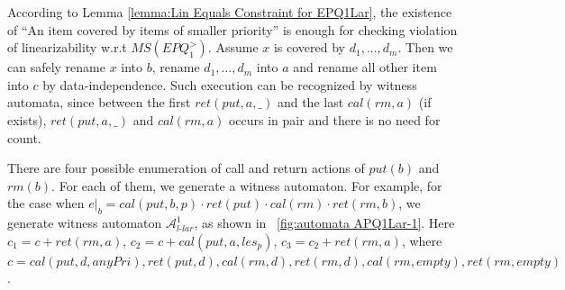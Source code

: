 According to Lemma \ref{lemma:Lin Equals Constraint for EPQ1Lar}, the existence of ``An item covered by items of smaller priority'' is enough for checking violation of linearizability w.r.t $\textit{MS}(\textit{EPQ}_1^{>})$. Assume $x$ is covered by $d_1,\ldots,d_m$. Then we can safely rename $x$ into $b$, rename $d_1,\ldots,d_m$ into $a$ and rename all other item into $c$ by data-independence. Such execution can be recognized by witness automata, since between the first $\textit{ret}(\textit{put},a,\_)$ and the last $\textit{cal}(\textit{rm},a)$ (if exists), $\textit{ret}(\textit{put},a,\_)$ and $\textit{cal}(\textit{rm},a)$ occurs in pair and there is no need for count.

There are four possible enumeration of call and return actions of $\textit{put}(b)$ and $\textit{rm}(b)$. For each of them, we generate a witness automaton. For example, for the case when $e \vert_{b} = \textit{cal}(\textit{put},b,p) \cdot \textit{ret}(\textit{put}) \cdot \textit{cal}(\textit{rm}) \cdot \textit{ret}(\textit{rm},b)$, we generate witness automaton $\mathcal{A}_{\textit{l-lar}}^1$, as shown in \figurename~\ref{fig:automata APQ1Lar-1}. Here $c_1 = c + \textit{ret}(\textit{rm},a)$, $c_2 = c + \textit{cal}(\textit{put},a,\textit{les}_p)$, $c_3 = c_2 + \textit{ret}(\textit{rm},a)$, where $c = \textit{cal}(\textit{put},d,\textit{anyPri}),\textit{ret}(\textit{put},d), \textit{cal}(\textit{rm},d), \textit{ret}(\textit{rm},d),\textit{cal}(\textit{rm},\textit{empty}), \textit{ret}(\textit{rm},\textit{empty})$.

